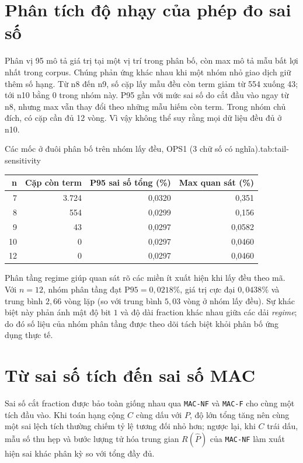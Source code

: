 \section{Phân tích độ nhạy của phép đo sai số}

Phân vị 95 mô tả giá trị tại một vị trí trong phân bố,
còn max mô tả mẫu bất lợi nhất trong corpus. Chúng
phản ứng khác nhau khi một nhóm nhỏ giao dịch giữ
thêm số hạng. Từ n8 đến n9, số cặp lấy mẫu đều còn
term giảm từ 554 xuống 43; tới n10 bằng 0 trong nhóm
này. P95 gần với mức sai số do cắt đầu vào ngay từ
n8, nhưng max vẫn thay đổi theo những mẫu hiếm còn term.
Trong nhóm chủ đích, có cặp cần đủ 12 vòng. Vì vậy
không thể suy rằng mọi dữ liệu đều đủ ở n10.

\begin{engineeringtable}{Các mốc ở đuôi phân bố trên nhóm lấy đều, OPS1 (3 chữ số có nghĩa).}{tab:tail-sensitivity}
\begin{tabular}{rrrr}
\toprule
n & Cặp còn term & P95 sai số tổng (\%) & Max quan sát (\%) \\
\midrule
7 & 3.724 & 0,0320 & 0,351 \\
8 & 554 & 0,0299 & 0,156 \\
9 & 43 & 0,0297 & 0,0582 \\
10 & 0 & 0,0297 & 0,0460 \\
12 & 0 & 0,0297 & 0,0460 \\
\bottomrule
\end{tabular}
\end{engineeringtable}

Phân tầng regime giúp quan sát rõ các miền ít xuất hiện khi lấy đều theo mã. Với
$n=12$, nhóm phân tầng đạt $\mathrm{P95} = 0{,}0218\%$, giá trị cực đại $0{,}0438\%$
và trung bình $2{,}66$ vòng lặp (so với trung bình $5{,}03$ vòng ở nhóm lấy đều).
Sự khác biệt này phản ánh mật độ bit $1$ và độ dài fraction khác nhau giữa các dải
\textit{regime}; do đó số liệu của nhóm phân tầng được theo dõi tách biệt khỏi phân
bố ứng dụng thực tế.

\section{Từ sai số tích đến sai số MAC}

Sai số cắt fraction được bảo toàn giống nhau qua \texttt{MAC-NF} và \texttt{MAC-F}
cho cùng một tích đầu vào. Khi toán hạng cộng $C$ cùng dấu với $P$, độ lớn tổng tăng
nên cùng một sai lệch tích thường chiếm tỷ lệ tương đối nhỏ hơn; ngược lại, khi $C$
trái dấu, mẫu số thu hẹp và bước lượng tử hóa trung gian $R(\widehat P)$ của
\texttt{MAC-NF} làm xuất hiện sai khác phân kỳ so với tổng đầy đủ.

